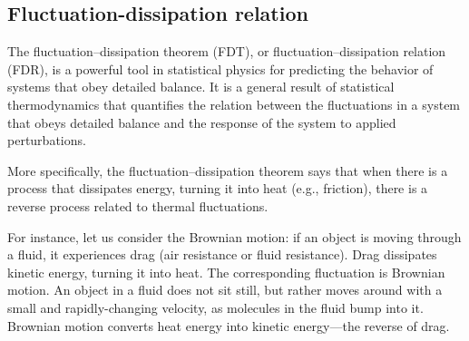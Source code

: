 \documentclass[../main/main.tex]{subfiles}
\begin{document}
\subsection{Fluctuation-dissipation relation}
The fluctuation–dissipation theorem (FDT), or fluctuation–dissipation relation (FDR), is a powerful tool in statistical physics for predicting the behavior of systems that obey detailed balance. It is a general result of statistical thermodynamics that quantifies the relation between the fluctuations in a system that obeys detailed balance and the response of the system to applied perturbations.

More specifically, the fluctuation–dissipation theorem says that when there is a process that dissipates energy, turning it into heat (e.g., friction), there is a reverse process related to thermal fluctuations.

For instance, let us consider the Brownian motion: if an object is moving through a fluid, it experiences drag (air resistance or fluid resistance). Drag dissipates kinetic energy, turning it into heat. The corresponding fluctuation is Brownian motion. An object in a fluid does not sit still, but rather moves around with a small and rapidly-changing velocity, as molecules in the fluid bump into it. Brownian motion converts heat energy into kinetic energy—the reverse of drag.
\end{document}
